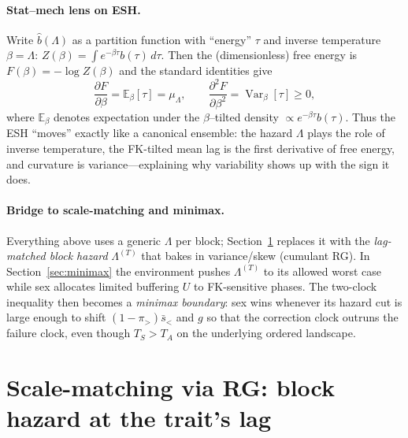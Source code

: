 \documentclass[11pt]{article}
\theoremstyle{upright}
\newcommand{\hazT}[1]{\Lambda^{(#1)}}          %
\begin{document}
\paragraph{Stat–mech lens on ESH.}
Write $\widehat b(\Lambda)$ as a partition function with ``energy'' $\tau$ and inverse temperature $\beta=\Lambda$:
$Z(\beta)=\int e^{-\beta \tau}b(\tau)\,d\tau$. Then the (dimensionless) free energy is
$F(\beta)=-\log Z(\beta)$ and the standard identities give
\[
\frac{\partial F}{\partial \beta}=\mathbb E_\beta[\tau]=\mu_\Lambda,\qquad
\frac{\partial^2 F}{\partial \beta^2}=\operatorname{Var}_\beta[\tau]\ge 0,
\]
where $\mathbb E_\beta$ denotes expectation under the $\beta$–tilted density $\propto e^{-\beta \tau}b(\tau)$.
Thus the ESH “moves” exactly like a canonical ensemble: the hazard \(\Lambda\) plays the role of inverse temperature,
the FK-tilted mean lag is the first derivative of free energy, and curvature is variance—explaining why variability
shows up with the sign it does.

\paragraph{Bridge to scale-matching and minimax.}
Everything above uses a generic $\Lambda$ per block; Section~\ref{sec:block-hazard} replaces it with the \emph{lag-matched block hazard} $\hazT{T}$ that bakes in variance/skew (cumulant RG). In Section~\ref{sec:minimax} the environment pushes $\hazT{T}$ to its allowed worst case while sex allocates limited buffering $U$ to FK-sensitive phases. The two-clock inequality then becomes a \emph{minimax boundary}: sex wins whenever its hazard cut is large enough to shift $(1-\pi_{>})\bar s_{<}$ and $g$ so that the correction clock outruns the failure clock, even though $T_S>T_A$ on the underlying ordered landscape.

\section{Scale-matching via RG: block hazard at the trait's lag}
\label{sec:block-hazard}
\end{document}
